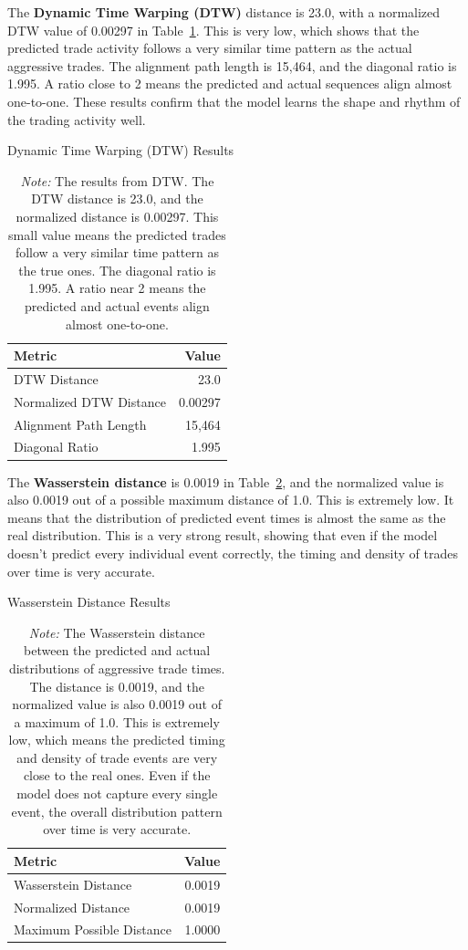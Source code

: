 The \textbf{Dynamic Time Warping (DTW)} distance is 23.0, with a normalized DTW value of 0.00297 in Table~\ref{tab:dtw}. This is very low, which shows that the predicted trade activity follows a very similar time pattern as the actual aggressive trades. The alignment path length is 15,464, and the diagonal ratio is 1.995. A ratio close to 2 means the predicted and actual sequences align almost one-to-one. These results confirm that the model learns the shape and rhythm of the trading activity well.
\begin{table}[H]
    \centering
    \caption{Dynamic Time Warping (DTW) Results} \label{tab:dtw}
    \caption*{\textit{Note:} The results from DTW. The DTW distance is 23.0, and the normalized distance is 0.00297. This small value means the predicted trades follow a very similar time pattern as the true ones. The diagonal ratio is 1.995. A ratio near 2 means the predicted and actual events align almost one-to-one.}
    \begin{tabular}{lr}
    \toprule
    Metric & Value \\
    \midrule
    DTW Distance & 23.0 \\
    Normalized DTW Distance & 0.00297 \\
    Alignment Path Length & 15,464 \\
    Diagonal Ratio & 1.995 \\
    \bottomrule
    \end{tabular}
\end{table}

The \textbf{Wasserstein distance} is 0.0019 in Table~\ref{tb:wasserstein-results}, and the normalized value is also 0.0019 out of a possible maximum distance of 1.0. This is extremely low. It means that the distribution of predicted event times is almost the same as the real distribution. This is a very strong result, showing that even if the model doesn't predict every individual event correctly, the timing and density of trades over time is very accurate.
\begin{table}[H]
    \centering
    \caption{Wasserstein Distance Results}
    \caption*{\textit{Note:} The Wasserstein distance between the predicted and actual distributions of aggressive trade times. The distance is 0.0019, and the normalized value is also 0.0019 out of a maximum of 1.0. This is extremely low, which means the predicted timing and density of trade events are very close to the real ones. Even if the model does not capture every single event, the overall distribution pattern over time is very accurate.}
    \label{tb:wasserstein-results}
    \begin{tabular}{lr}
    \toprule
    Metric & Value \\
    \midrule
    Wasserstein Distance & 0.0019 \\
    Normalized Distance & 0.0019 \\
    Maximum Possible Distance & 1.0000 \\
    \bottomrule
    \end{tabular}
\end{table}


